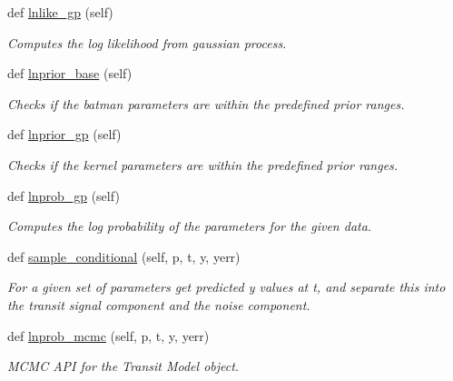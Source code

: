 \begin{DoxyCompactItemize}
def \hyperlink{classexospec_1_1_transit_model_1_1_transit_model_a6ff23ea2dfc11348b0ad560c66485be2}{lnlike\+\_\+gp} (self)
\begin{DoxyCompactList}\small\item\em Computes the log likelihood from gaussian process. \end{DoxyCompactList}\item 
def \hyperlink{classexospec_1_1_transit_model_1_1_transit_model_a16ee8da5be7114208af70aa3408615f6}{lnprior\+\_\+base} (self)
\begin{DoxyCompactList}\small\item\em Checks if the batman parameters are within the predefined prior ranges. \end{DoxyCompactList}\item 
def \hyperlink{classexospec_1_1_transit_model_1_1_transit_model_a2c0c838bfee6bdeac30082ebc6cc9517}{lnprior\+\_\+gp} (self)
\begin{DoxyCompactList}\small\item\em Checks if the kernel parameters are within the predefined prior ranges. \end{DoxyCompactList}\item 
def \hyperlink{classexospec_1_1_transit_model_1_1_transit_model_aa791197371e843567a9fdb8565abf154}{lnprob\+\_\+gp} (self)
\begin{DoxyCompactList}\small\item\em Computes the log probability of the parameters for the given data. \end{DoxyCompactList}\item 
def \hyperlink{classexospec_1_1_transit_model_1_1_transit_model_a3a01d6ec61e2e9e95b6d2fd389c0d577}{sample\+\_\+conditional} (self, p, t, y, yerr)
\begin{DoxyCompactList}\small\item\em For a given set of parameters get predicted y values at t, and separate this into the transit signal component and the noise component. \end{DoxyCompactList}\item 
def \hyperlink{classexospec_1_1_transit_model_1_1_transit_model_a11a124a9e7257c0faa6a3577454fa670}{lnprob\+\_\+mcmc} (self, p, t, y, yerr)
\begin{DoxyCompactList}\small\item\em M\+C\+MC A\+PI for the Transit Model object. \end{DoxyCompactList}\end{DoxyCompactItemize}
